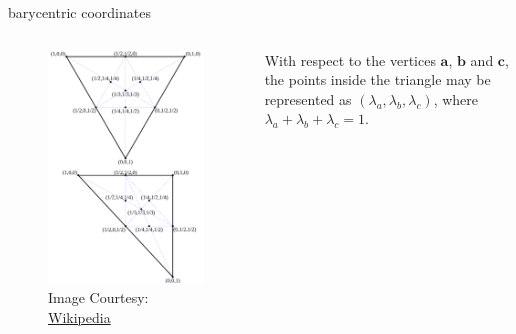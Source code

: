 \documentclass[aspectratio=169,xcolor={dvipsnames,svgnames}]{beamer}
\begin{document}
\begin{frame}[label={sec:org0933688}]{barycentric coordinates}
\begin{columns}
\begin{column}{.3\columnwidth}
\begin{figure}[htbp]
\centering
\includegraphics[width=.9\linewidth]{images/TriangleBarycentricCoordinates.svg.png}
\caption{Image Courtesy: \href{https://commons.wikimedia.org/wiki/File:TriangleBarycentricCoordinates.svg}{Wikipedia}}
\end{figure}
\end{column}

\begin{column}{.5\columnwidth}
With respect to the vertices \(\mathbf{a}\), \(\mathbf{b}\)
and \(\mathbf{c}\), the points inside the triangle may be
represented as \((\lambda_{a},\lambda_{b},\lambda_{c})\),
where \(\lambda_{a} + \lambda_{b} + \lambda_{c} = 1\).
\end{column}
\end{columns}
\end{frame}
\end{document}
